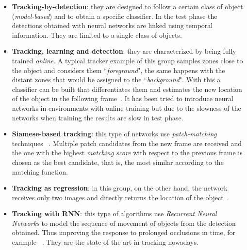 \begin{itemize}
\item \textbf{Tracking-by-detection}: they are designed to follow a certain class of object (\textit{model-based}) and to obtain a specific classifier. In the test phase the detections obtained with neural networks are linked using temporal information. They are limited to a single class of objects.
\item \textbf{Tracking, learning and detection}: they are characterized by being fully trained \textit{online}. A typical tracker example of this group samples zones close to the object and considers them ``\textit{foreground}", the same happens with the distant zones that would be assigned to the ``\textit{background}". With this a classifier can be built that differentiates them and estimates the new location of the object in the following frame~\cite{babenko2009visual}. It has been tried to introduce neural networks in environments with online training but due to the slowness of the networks when training the results are slow in test phase.
\item \textbf{Siamese-based tracking}: this type of networks use \textit{patch-matching} techniques ~\cite{tao2016siamese}.   Multiple patch candidates from the new frame are received and the one with the highest \textit{matching score} with respect to the previous frame is chosen as the best candidate, that is, the most similar according to the matching function.
\item \textbf{Tracking as regression}: in this group, on the other hand, the network receives only two images and directly returns the location of the object~\cite{held2016learning}.
\item \textbf{Tracking with RNN}: this type of algorithms use \textit{Recurrent Neural Networks} to model the sequence of movement of objects from the detection obtained. Thus improving the response to prolonged occlusions in time, for example ~\cite{sadeghian2017tracking}. They are the state of the art in tracking nowadays.
\end{itemize}
